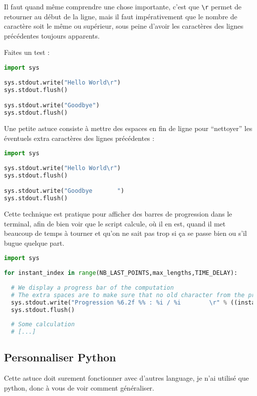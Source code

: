 \documentclass[a4paper,twoside]{article}
\begin{document}
\bigskip

Il faut quand même comprendre une chose importante, c'est que \verb|\r| permet de retourner au début de la ligne, mais il faut impérativement que le nombre de caractère soit le même ou supérieur, sous peine d'avoir les caractères des lignes précédentes toujours apparents. 

Faites un test : 
\begin{lstlisting}[language=python]
import sys
 
sys.stdout.write("Hello World\r")
sys.stdout.flush()

sys.stdout.write("Goodbye")
sys.stdout.flush()
\end{lstlisting}

Une petite astuce consiste à mettre des espaces en fin de ligne pour ``nettoyer'' les éventuels extra caractères des lignes précédentes :
\begin{lstlisting}[language=python]
import sys
 
sys.stdout.write("Hello World\r")
sys.stdout.flush()

sys.stdout.write("Goodbye       ")
sys.stdout.flush()
\end{lstlisting}


\bigskip

Cette technique est pratique pour afficher des barres de progression dans le terminal, afin de bien voir que le script calcule, où il en est, quand il met beaucoup de temps à tourner et qu'on ne sait pas trop si ça se passe bien ou s'il bugue quelque part.
\begin{lstlisting}[language=python]
import sys
 
for instant_index in range(NB_LAST_POINTS,max_lengths,TIME_DELAY):
  
  # We display a progress bar of the computation
  # The extra spaces are to make sure that no old character from the previous line will appear
  sys.stdout.write("Progression %6.2f %% : %i / %i        \r" % ((instant_index * 100. / float(max_lengths)), instant_index, max_lengths))
  sys.stdout.flush()
  
  # Some calculation
  # [...]
\end{lstlisting}



\subsection{Personnaliser Python}
Cette astuce doit surement fonctionner avec d'autres language, je  n'ai utilisé que python, donc à vous de voir comment généraliser.
\end{document}
